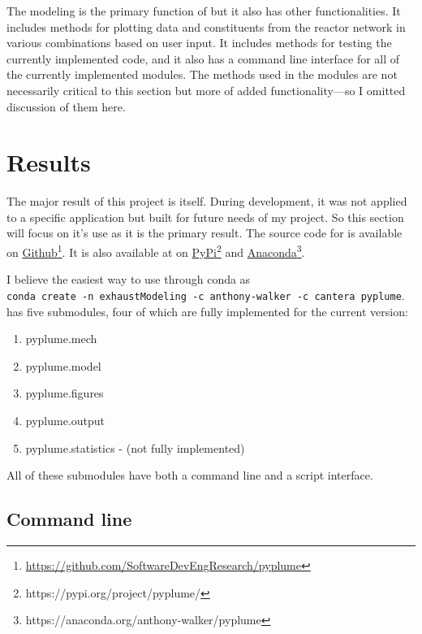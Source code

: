 \documentclass[smallextended,referee]{svjour3}
\begin{document}
The modeling is the primary function of \pyplume{} but it also has other functionalities. It includes methods for plotting data and constituents from the reactor network in various combinations based on user input. It includes methods for testing the currently implemented code, and it also has a command line interface for all of the currently implemented modules. The methods used in the modules are not necessarily critical to this section but more of added functionality---so I omitted discussion of them here.




\section{Results}
The major result of this project is \pyplume{} itself. During development, it was not applied to a specific application but built for future needs of my project. So this section will focus on it's use as it is the primary result. The source code for \pyplume{} is available on \href{https://github.com/SoftwareDevEngResearch/pyplume}{Github}\footnote{\url{https://github.com/SoftwareDevEngResearch/pyplume}}. It is also available at on \href{https://pypi.org/project/pyplume/}{PyPi}\footnote{https://pypi.org/project/pyplume/} and \href{https://anaconda.org/anthony-walker/pyplume}{Anaconda}\footnote{https://anaconda.org/anthony-walker/pyplume}.

I believe the easiest way to use \pyplume{} through conda as
\\
\noindent
\texttt{conda create -n exhaustModeling -c anthony-walker -c cantera pyplume}.
\pyplume{} has five submodules, four of which are fully implemented for the current version:
\begin{enumerate}[noitemsep,topsep=0pt]
    \item pyplume.mech
    \item pyplume.model
    \item pyplume.figures
    \item pyplume.output
    \item pyplume.statistics - (not fully implemented)
\end{enumerate}
\noindent
All of these submodules have both a command line and a script interface.

\subsection{\textbf{Command line}}
\end{document}
